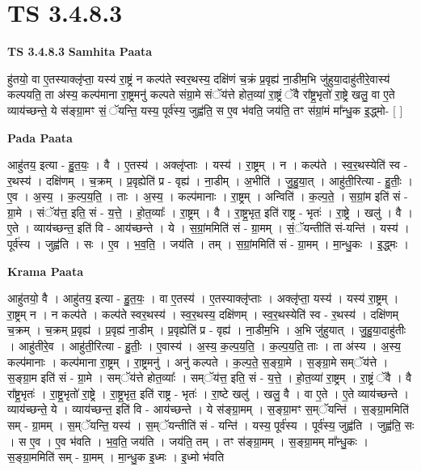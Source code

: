 \documentclass[17pt]{extarticle}
\begin{document}
\section{ TS 3.4.8.3 }

\textbf{TS 3.4.8.3 } \newline
\textbf{Samhita Paata} \newline

हु॑तयो॒ वा ए॒तस्याक्लृ॑प्ता॒ यस्य॑ रा॒ष्ट्रं न कल्प॑ते स्वर॒थस्य॒ दक्षि॑णं च॒क्रं प्र॒वृह्य॑ ना॒डीम॒भि जु॑हुया॒दाहु॑तीरे॒वास्य॑ कल्पयति॒ ता अ॑स्य॒ कल्प॑माना रा॒ष्ट्रमनु॑ कल्पते संग्रा॒मे संॅय॑त्ते होत॒व्या॑ रा॒ष्ट्रं ॅवै रा᳚ष्ट्र॒भृतो॑ रा॒ष्ट्रे खलु॒ वा ए॒ते व्याय॑च्छन्ते॒ ये स॑ङ्ग्रा॒मꣳ सं॒ ॅयन्ति॒ यस्य॒ पूर्व॑स्य॒ जुह्व॑ति॒ स ए॒व भ॑वति॒ जय॑ति॒ तꣳ स॑ग्रां॒मं मा᳚न्धु॒क इ॒द्ध्मो- [  ] \newline

\textbf{Pada Paata} \newline

आहु॑तय॒ इत्या - हु॒त॒यः॒ । वै । ए॒तस्य॑ । अक्लृ॑प्ताः । यस्य॑ । रा॒ष्ट्रम् । न । कल्प॑ते । स्व॒र॒थस्येति॑ स्व - र॒थस्य॑ । दक्षि॑णम् । च॒क्रम् । प्र॒वृह्येति॑ प्र - वृह्य॑ । ना॒डीम् । अ॒भीति॑ । जु॒हु॒या॒त् । आहु॑ती॒रित्या - हु॒तीः॒ । ए॒व । अ॒स्य॒ । क॒ल्प॒य॒ति॒ । ताः । अ॒स्य॒ । कल्प॑मानाः । रा॒ष्ट्रम् । अन्विति॑ । क॒ल्प॒ते॒ । स॒ग्रां॒म इति॑ सं - ग्रा॒मे । संॅय॑त्त॒ इति॒ सं - य॒त्ते॒ । हो॒त॒व्याः᳚ । रा॒ष्ट्रम् । वै । रा॒ष्ट्र॒भृत॒ इति॑ राष्ट्र - भृतः॑ । रा॒ष्ट्रे । खलु॑ । वै । ए॒ते । व्याय॑च्छन्त॒ इति॑ वि - आय॑च्छन्ते । ये । स॒ग्रां॒ममिति॑ सं - ग्रा॒मम् । सं॒ॅयन्तीति॑ सं-यन्ति॑ । यस्य॑ । पूर्व॑स्य । जुह्व॑ति । सः । ए॒व । भ॒व॒ति॒ । जय॑ति । तम् । स॒ग्रां॒ममिति॑ सं - ग्रा॒मम् । मा॒न्धु॒कः । इ॒द्ध्मः ।  \newline


\textbf{Krama Paata} \newline

आहु॑तयो॒ वै । आहु॑तय॒ इत्या - हु॒त॒यः॒ । वा ए॒तस्य॑ । ए॒तस्याक्लृ॑प्ताः । अक्लृ॑प्ता॒ यस्य॑ । यस्य॑ रा॒ष्ट्रम् । रा॒ष्ट्रम् न । न कल्प॑ते । कल्प॑ते स्वर॒थस्य॑ । स्व॒र॒थस्य॒ दक्षि॑णम् । स्व॒र॒थस्येति॑ स्व - र॒थस्य॑ । दक्षि॑णम् च॒क्रम् । च॒क्रम् प्र॒वृह्य॑ । प्र॒वृह्य॑ ना॒डीम् । प्र॒वृह्येति॑ प्र - वृह्य॑ । ना॒डीम॒भि । अ॒भि जु॑हुयात् । जु॒हु॒या॒दाहु॑तीः । आहु॑तीरे॒व । आहु॑ती॒रित्या - हु॒तीः॒ । ए॒वास्य॑ । अ॒स्य॒ क॒ल्प॒य॒ति॒ । क॒ल्प॒य॒ति॒ ताः । ता अ॑स्य । अ॒स्य॒ कल्प॑मानाः । कल्प॑माना रा॒ष्ट्रम् । रा॒ष्ट्रमनु॑ । अनु॑ कल्पते । क॒ल्प॒ते॒ स॒ङ्ग्रा॒मे । स॒ङ्ग्रा॒मे सम्ॅय॑त्ते । स॒ङ्ग्रा॒म इति॑ सं - ग्रा॒मे । सम्ॅय॑त्ते होत॒व्याः᳚ । सम्ॅय॑त्त॒ इति॒ सं - य॒त्ते॒ । हो॒त॒व्या॑ रा॒ष्ट्रम् । रा॒ष्ट्रं ॅवै । वै रा᳚ष्ट्र॒भृतः॑ । रा॒ष्ट्र॒भृतो॑ रा॒ष्ट्रे । रा॒ष्ट्र॒भृत॒ इति॑ राष्ट्र - भृतः॑ । रा॒ष्टे खलु॑ । खलु॒ वै । वा ए॒ते । ए॒ते व्याय॑च्छन्ते । व्याय॑च्छन्ते॒ ये । व्याय॑च्छन्त॒ इति॑ वि - आय॑च्छन्ते । ये स॑ङ्ग्रा॒मम् । स॒ङ्ग्रा॒मꣳ स॒म्ॅयन्ति॑ । स॒ङ्ग्रा॒ममिति॑ सम् - ग्रा॒मम् । स॒म्ॅयन्ति॒ यस्य॑ । स॒म्ॅयन्तीति॑ सं - यन्ति॑ । यस्य॒ पूर्व॑स्य । पूर्व॑स्य॒ जुह्व॑ति । जुह्व॑ति॒ सः । स ए॒व । ए॒व भ॑वति । भ॒व॒ति॒ जय॑ति । जय॑ति॒ तम् । तꣳ स॑ङ्ग्रा॒मम् । स॒ङ्ग्रा॒मम् मा᳚न्धु॒कः । स॒ङ्ग्रा॒ममिति॑ सम् - ग्रा॒मम् । मा॒न्धु॒क इ॒ध्मः । इ॒ध्मो भ॑वति \newline
\end{document}

